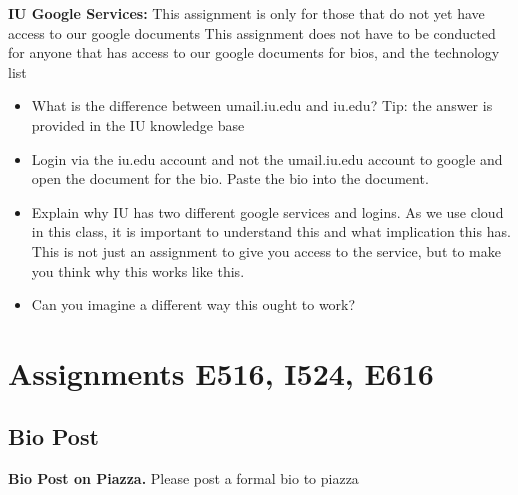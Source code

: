 \begin{exercise}\label{E:e222-iu-google}

  {\bf IU Google Services:} This assignment is only for those that do
  not yet have access to our google documents This assignment does not
  have to be conducted for anyone that has access to our google
  documents for bios, and the technology list

  \begin{itemize}
 
  \item What is the difference between umail.iu.edu and iu.edu? Tip:
    the answer is provided in the IU knowledge base

  \item Login via the iu.edu account and not the umail.iu.edu account
    to google and open the document for the bio. Paste the bio into
    the document.

  \item Explain why IU has two different google services and
    logins. As we use cloud in this class, it is important to
    understand this and what implication this has. This is not just an
    assignment to give you access to the service, but to make you
    think why this works like this.

  \item Can you imagine a different way this ought to work?

  \end{itemize}

\end{exercise}

\section{Assignments E516, I524, E616}
\label{s:616-assignments}

\subsection{Bio Post}\label{a:616-bio}

\begin{exercise}\label{E:616-bio-piazza}
{\bf Bio Post on Piazza.} Please post a formal bio to piazza
\end{exercise}

